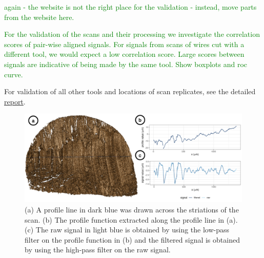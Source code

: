 \documentclass[fleqn,10pt]{wlscirep}
\newcommand{\hh}[1]{{\textcolor{Green}{#1}}}
\begin{document}
\hh{again - the website is not the right place for the validation - instead, move parts from the website here. }

\hh{For the validation of the scans and their processing we investigate the correlation scores of pair-wise aligned signals. For signals from scans of wires cut with a different tool, we would expect a low correlation score. Large scores between signals are indicative of being made by the same tool. 
Show boxplots and roc curve. }

For validation of all other tools and locations of scan replicates, see
the detailed
\href{https://heike.github.io/Wirecuts/data-descriptor/Technical_Validation.html}{report}.

\begin{figure}[ht]
\centering
\includegraphics[width=0.9\linewidth]{T1AW-LI-R1-profiles-signals.png}
\caption{(a) A profile line in dark blue was drawn across the striations of the scan. (b) The profile function extracted along the profile line in (a). (c) The raw signal in light blue is obtained by using the low-pass filter on the profile function in (b) and the filtered signal is obtained by using the high-pass filter on the raw signal.}
\label{fig-T1AW-LI-R1-profiles-signals}
\end{figure}
\end{document}
